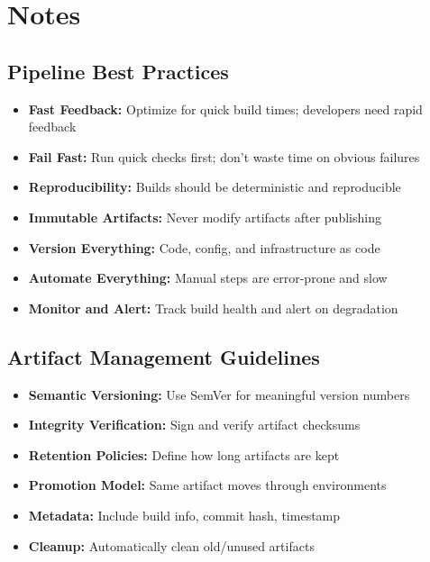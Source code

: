 \documentclass[11pt,letterpaper]{article}
\begin{document}
\section{Notes}

\subsection{Pipeline Best Practices}

\begin{pipelinebox}
\begin{itemize}[nosep]
    \item \textbf{Fast Feedback:} Optimize for quick build times; developers need rapid feedback
    \item \textbf{Fail Fast:} Run quick checks first; don't waste time on obvious failures
    \item \textbf{Reproducibility:} Builds should be deterministic and reproducible
    \item \textbf{Immutable Artifacts:} Never modify artifacts after publishing
    \item \textbf{Version Everything:} Code, config, and infrastructure as code
    \item \textbf{Automate Everything:} Manual steps are error-prone and slow
    \item \textbf{Monitor and Alert:} Track build health and alert on degradation
\end{itemize}
\end{pipelinebox}

\subsection{Artifact Management Guidelines}

\begin{artifactbox}
\begin{itemize}[nosep]
    \item \textbf{Semantic Versioning:} Use SemVer for meaningful version numbers
    \item \textbf{Integrity Verification:} Sign and verify artifact checksums
    \item \textbf{Retention Policies:} Define how long artifacts are kept
    \item \textbf{Promotion Model:} Same artifact moves through environments
    \item \textbf{Metadata:} Include build info, commit hash, timestamp
    \item \textbf{Cleanup:} Automatically clean old/unused artifacts
\end{itemize}
\end{artifactbox}
\end{document}
